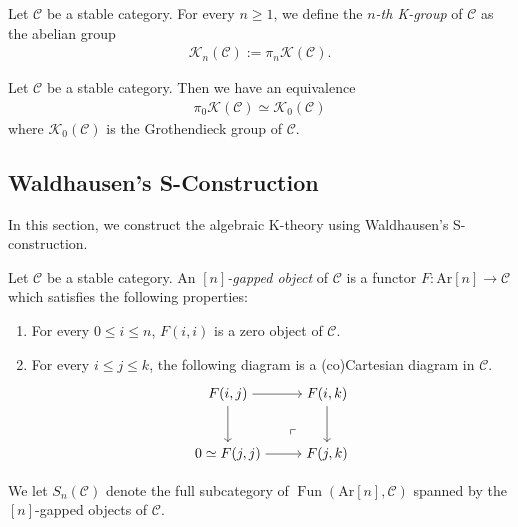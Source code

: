 \documentclass[a4paper,dvipdfmx,11pt,reqno]{amsart}
\DeclareMathOperator{\Fun}{Fun}
\newcommand{\C}{\mathcal{C}}
\newcommand{\K}{\mathcal{K}}
\newcommand{\Ar}{\mathrm{Ar}}
\begin{document}
\begin{definition}
  Let $\C$ be a stable category.
  For every $n \geq 1$, we define the \textit{$n$-th K-group} of $\C$ as the abelian group 
  \begin{align*}
    \K_n(\C) := \pi_n\K(\C).
  \end{align*}
\end{definition}

\begin{remark}
  Let $\C$ be a stable category.
  Then we have an equivalence 
  \begin{align*}
    \pi_0\K(\C) \simeq \K_0(\C)
  \end{align*}
  where $\K_0(\C)$ is the Grothendieck group of $\C$.
\end{remark}

\subsection{Waldhausen's S-Construction}

In this section, we construct the algebraic K-theory using Waldhausen's S-construction. 

\begin{definition}
  Let $\C$ be a stable category.
  An \textit{$[n]$-gapped object} of $\C$ is a functor $F : \Ar[n] \to \C$ which satisfies the following properties:
  \begin{enumerate}
    \item For every $0 \leq i \leq n$, $F(i,i)$ is a zero object of $\C$.
    \item For every $i \leq j \leq k$, the following diagram is a (co)Cartesian diagram in $\C$.
    \[\begin{tikzpicture}[auto,->] 
      \node (tl) at (0,1.5) {$F(i,j)$}; 
      \node (tr) at (2.5,1.5) {$F(i,k)$};
      \node (bl) at (0,0) {$0 \simeq F(j,j)$}; 
      \node (br) at (2.5,0) {$F(j,k)$}; 
      \draw (tl) -- node {} (tr); 
      \draw (bl) -- node[swap] {} (br); 
      \draw (tl) -- node[swap] {} (bl);
      \draw (tr) -- node {} (br); 
      \node at ([xshift=-1.5cm, yshift=0.8cm] br.south east) {$\ulcorner$};
    \end{tikzpicture}\]
  \end{enumerate}
  We let $S_n(\C)$ denote the full subcategory of $\Fun(\Ar[n],\C)$ spanned by the $[n]$-gapped objects of $\C$.
\end{definition}
\end{document}
